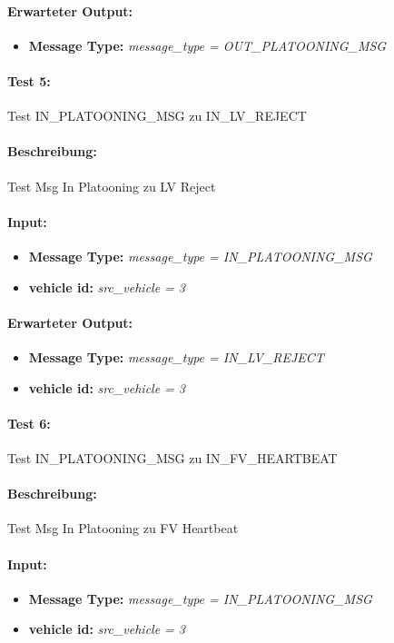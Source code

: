 \documentclass[a4paper, 12pt, titlepage]{scrartcl}
\begin{document}
{\begin{itemize}
			\end{itemize}
			\paragraph{Erwarteter Output:}
			\begin{itemize} \itemsep-0.5em
				\item \textbf{Message Type:} \emph{message\_type = OUT\_PLATOONING\_MSG}
			\end{itemize}	

			\paragraph{Test 5:}{Test IN\_PLATOONING\_MSG zu IN\_LV\_REJECT}
			\paragraph{Beschreibung:} Test Msg In Platooning zu LV Reject
			\paragraph{Input:}
			\begin{itemize} \itemsep-0.5em
				\item \textbf{Message Type:} \emph{message\_type = IN\_PLATOONING\_MSG}
				\item \textbf{vehicle id:} \emph{src\_vehicle = 3}
			\end{itemize}
			\paragraph{Erwarteter Output:}
			\begin{itemize} \itemsep-0.5em
				\item \textbf{Message Type:} \emph{message\_type = IN\_LV\_REJECT}
				\item \textbf{vehicle id:} \emph{src\_vehicle = 3}
			\end{itemize}
			
			\paragraph{Test 6:}{Test IN\_PLATOONING\_MSG zu IN\_FV\_HEARTBEAT}
			\paragraph{Beschreibung:} Test Msg In Platooning zu FV Heartbeat
			\paragraph{Input:}
			\begin{itemize} \itemsep-0.5em
				\item \textbf{Message Type:} \emph{message\_type = IN\_PLATOONING\_MSG}
				\item \textbf{vehicle id:} \emph{src\_vehicle = 3}
			\end{itemize}
}
\end{document}
